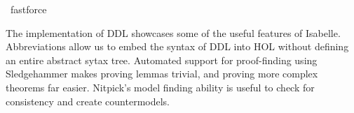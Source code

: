 \begin{isabellebody}
\ fastforce\isanewline
\ \ \isamarkupfalse%
\isanewline
%
\isanewline
{}\isamarkupfalse%
%
\endisatagproof
{\isafoldproof}%
%
\isadelimproof
%
\endisadelimproof
%
\begin{isamarkuptext}%
The implementation of DDL showcases some of the useful features of Isabelle. Abbreviations allow
us to embed the syntax of DDL into HOL without defining an entire abstract sytax tree. Automated 
support for proof-finding using Sledgehammer makes proving lemmas trivial, and proving more complex theorems
far easier. Nitpick's model finding ability is useful to check for consistency and create countermodels.%
\end{isamarkuptext}\isamarkuptrue%
%
\isadelimdocument
%
\endisadelimdocument
%
\isatagdocument
%
\endisatagdocument
{\isafolddocument}%
%
\isadelimdocument
%
\endisadelimdocument
%
\isadelimproof
%
\endisadelimproof
%
\isatagproof
%
\endisatagproof
{\isafoldproof}%
%
\isadelimproof
%
\endisadelimproof
%
\isadelimproof
%
\endisadelimproof
%
\isatagproof
%
\endisatagproof
{\isafoldproof}%
%
\isadelimproof
%
\endisadelimproof
%
\isadelimdocument
%
\endisadelimdocument
%
\isatagdocument
%
\endisatagdocument
{\isafolddocument}%
%
\isadelimdocument
%
\endisadelimdocument
%
\isadelimproof
%
\endisadelimproof
%
\isatagproof
%
\endisatagproof
{\isafoldproof}%
%
\isadelimproof
%
\endisadelimproof
%
\isadelimproof
%
\endisadelimproof
%
\isatagproof
%
\endisatagproof
{\isafoldproof}%
%
\isadelimproof
%
\endisadelimproof
%
\isadelimdocument
%
\endisadelimdocument
%
\isatagdocument
%
\endisatagdocument
{\isafolddocument}%
%
\isadelimdocument
%
\endisadelimdocument
%
\isadelimproof
%
\endisadelimproof
%
\isatagproof
%
\endisatagproof
{\isafoldproof}%
%
\isadelimproof
%
\endisadelimproof
%
\isadelimproof
%
\endisadelimproof
%
\isatagproof
%
\endisatagproof
{\isafoldproof}%
%
\isadelimproof
%
\endisadelimproof
%
\isadelimproof
%
\endisadelimproof
%
\isatagproof
%
\endisatagproof
{\isafoldproof}%
%
\isadelimproof
%
\endisadelimproof
%
\isadelimproof
%
\endisadelimproof
%
\isatagproof
%
\endisatagproof
{\isafoldproof}%
%
\isadelimproof
%
\endisadelimproof
%
\isadelimproof
%
\endisadelimproof
%
\isatagproof
%
\endisatagproof
{\isafoldproof}%
%
\isadelimproof
%
\endisadelimproof
%
\isadelimproof
%
\endisadelimproof
%
\isatagproof
%
\endisatagproof
{\isafoldproof}%
%
\isadelimproof
%
\endisadelimproof
%
\isadelimproof
%
\endisadelimproof
%
\isatagproof
%
\endisatagproof
{\isafoldproof}%
%
\isadelimproof
%
\endisadelimproof
%
\isadelimproof
%
\endisadelimproof
%
\isatagproof
%
\endisatagproof
{\isafoldproof}%
%
\isadelimproof
%
\endisadelimproof
%
\isadelimtheory
%
\endisadelimtheory
%
\isatagtheory
%
\endisatagtheory
{\isafoldtheory}%
%
\isadelimtheory
%
\endisadelimtheory
%
\end{isabellebody}%
